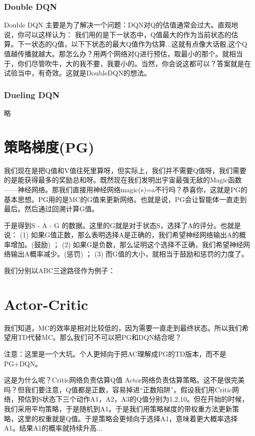 \documentclass[12pt]{article}
\begin{document}
\subsubsection{Double DQN}
Double DQN 主要是为了解决一个问题：DQN对Q的估值通常会过大。直观地说，你可以这样认为： 我们用的是下一状态中，Q值最大的作为当前状态的估算。下一状态的Q值，以下下状态的最大Q值作为估算...这就有点像大话骰,这个Q值越传播就越大。那怎么办？用两个网络对Q进行预估，取最小的那个。就相当于，你们尽管吹牛，大的我不要，我要小的。当然，你会说这都可以？答案就是在试验当中，有奇效。这就是DoubleDQN的想法。

\subsubsection{Dueling DQN}
略

\section{策略梯度(PG)}
我们现在是把Q值和V值往死里算呀，但实际上，我们并不需要Q值呀，我们需要的是能获得最多的奖励总和呀。既然现在我们发明出宇宙最强无敌的Magic函数——神经网络。那我们直接用神经网络magic(s)=a不行吗？恭喜你，这就是PG的基本思想。PG用的是MC的G值来更新网络。也就是说，PG会让智能体一直走到最后。然后通过回溯计算G值。

于是得到S - A - G 的数据。这里的G就是对于状态S，选择了A的评分。也就是说： (1) 如果G值正数，那么表明选择A是正确的，我们希望神经网络输出A的概率增加。(鼓励) ； (2) 如果G是负数，那么证明这个选择不正确，我们希望神经网络输出A概率减少。(惩罚) ； (3) 而G值的大小，就相当于鼓励和惩罚的力度了。

我们分别以ABC三途路径作为例子：

\section{Actor-Critic}
我们知道，MC的效率是相对比较低的，因为需要一直走到最终状态。所以我们希望用TD代替MC。那么我们可不可以把PG和DQN结合呢？

注意：这里是一个大坑。个人更倾向于把AC理解成PG的TD版本，而不是PG+DQN。

这是为什么呢？Critic网络负责估算Q值 Actor网络负责估算策略。这不是很完美吗？但我们要注意，Q值都是正数，容易掉进“正数陷阱”。假设我们用Critic网络，预估到S状态下三个动作A1，A2，A3的Q值分别为1,2,10。但在开始的时候，我们采用平均策略，于是随机到A1。于是我们用策略梯度的带权重方法更新策略，这里的权重就是Q值。于是策略会更倾向于选择A1，意味着更大概率选择A1。结果A1的概率就持续升高...
\end{document}
